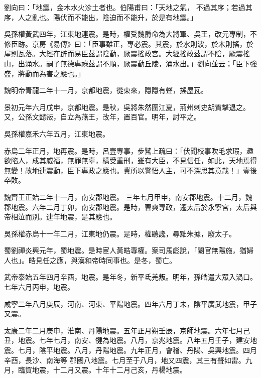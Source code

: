 \begin{pinyinscope}
 劉向曰：「地震，金木水火沴土者也。伯陽甫曰：「天地之氣，
 不過其序；若過其序，人之亂也。陽伏而不能出，陰迫而不能升，於是有地震。」



 吳孫權黃武四年，江東地連震。是時，權受魏爵命為大將軍、吳王，改元專制，不修臣跡。京房《易傳》曰：「臣事雖正，專必震。其震，於水則波，於木則搖，於屋則瓦落。大經在辟而易臣茲謂陰動，厥震搖政宮。大經搖政茲謂不陰，厥震搖山，出涌水。嗣子無德專祿茲謂不順，厥震動丘陵，涌水出。」劉向並云；「臣下強盛，將動而為害之應也。」



 魏明帝青龍二年十一月，京都地震，從東來，隱隱有聲，搖屋瓦。



 景初元年六月戊申，京都地震。是秋，吳將朱然圍江夏，荊州刺史胡質擊退之。又，公孫文懿叛，自立為燕王，改年，置百官。明年，討平之。



 吳孫權嘉禾六年五月，江東地震。



 赤烏二年正月，地再震。是時，呂壹專事，步騭上疏曰：「伏聞校事吹毛求瑕，趣欲陷人，成其威福，無罪無辜，橫受重刑，雖有大臣，不見信任，如此，天地焉得無變！故地連震動，臣下專政之應也。冀所以警悟人主，可不深思其意哉！」壹後卒敗。



 魏齊王正始二年十一月，南安郡地震。
 三年七月甲申，南安郡地震。十二月，魏郡地震。六年二月丁卯，南安郡地震。是時，曹爽專政，遷太后於永寧宮，太后與帝相泣而別。連年地震，是其應也。



 吳孫權赤烏十一年二月，江東地仍震。是時，權聽讒，尋黜朱據，廢太子。



 蜀劉禪炎興元年，蜀地震。是時宦人黃皓專權。案司馬彪說，「閹官無陽施，猶婦人也」。皓見任之應，與漢和帝時同事也。是冬，蜀亡。



 武帝泰始五年四月辛酉，地震。是年冬，新平氐羌叛。明年，孫皓遣大眾入渦口。
 七年六月丙申，地震。



 咸寧二年八月庚辰，河南、河東、平陽地震。四年六月丁未，陰平廣武地震，甲子又震。



 太康二年二月庚申，淮南、丹陽地震。五年正月朔壬辰，京師地震。六年七月己丑，地震。七年七月，南安、犍為地震。八月，京兆地震。八年五月壬子，建安地震。七月，陰平地震。八月，丹陽地震。九年正月，會稽、丹陽、吳興地震。四月辛酉，長沙、南海等
 郡國八地震。七月至于八月，地又四震，其三有聲如雷。九月，臨賀地震，十二月又震。十年十二月己亥，丹楊地震。




\end{pinyinscope}
